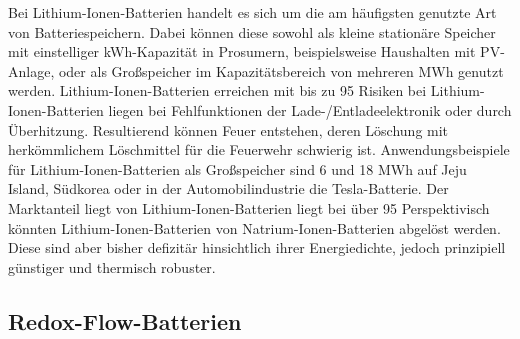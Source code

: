 Bei Lithium-Ionen-Batterien handelt es sich um die am häufigsten genutzte Art von Batteriespeichern. Dabei können diese sowohl als kleine stationäre Speicher mit einstelliger kWh-Kapazität in Prosumern, beispielsweise Haushalten mit PV-Anlage, oder als Großspeicher im Kapazitätsbereich von mehreren MWh genutzt werden.
Lithium-Ionen-Batterien erreichen mit bis zu 95 %
Risiken bei Lithium-Ionen-Batterien liegen bei Fehlfunktionen der Lade-/Entladeelektronik oder durch Überhitzung. Resultierend können Feuer entstehen, deren Löschung mit herkömmlichem Löschmittel für die Feuerwehr schwierig ist.
Anwendungsbeispiele für Lithium-Ionen-Batterien als Großspeicher sind 6 und 18 MWh auf Jeju Island, Südkorea oder in der Automobilindustrie die Tesla-Batterie. Der Marktanteil liegt von Lithium-Ionen-Batterien liegt bei über 95%
Perspektivisch könnten Lithium-Ionen-Batterien von Natrium-Ionen-Batterien abgelöst werden. Diese sind aber bisher defizitär hinsichtlich ihrer Energiedichte, jedoch prinzipiell günstiger und thermisch robuster. 

\subsection{Redox-Flow-Batterien}

